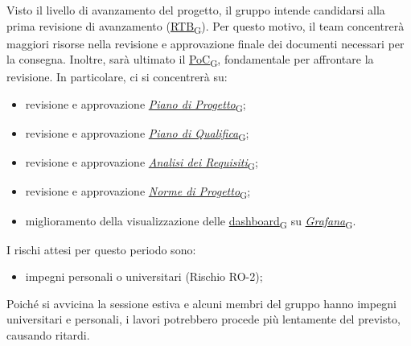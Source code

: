 Visto il livello di avanzamento del progetto, il gruppo intende candidarsi alla prima revisione di avanzamento (\href{https://7last.github.io/docs/rtb/documentazione-interna/glossario\#requirements-and-technology-baseline}{RTB\textsubscript{G}}). Per questo motivo, il team concentrerà maggiori risorse nella revisione e approvazione finale dei documenti necessari per la consegna. Inoltre, sarà ultimato il \href{https://7last.github.io/docs/rtb/documentazione-interna/glossario\#proof-of-concept}{PoC\textsubscript{G}}, fondamentale per affrontare la revisione. In particolare, ci si concentrerà su:
\begin{itemize}
	\item revisione e approvazione \href{https://7last.github.io/docs/rtb/documentazione-interna/glossario\#piano-di-progetto}{\textit{Piano di Progetto}\textsubscript{G}};
	\item revisione e approvazione \href{https://7last.github.io/docs/rtb/documentazione-interna/glossario\#piano-di-qualifica}{\textit{Piano di Qualifica}\textsubscript{G}};
	\item revisione e approvazione \href{https://7last.github.io/docs/rtb/documentazione-interna/glossario\#analisi-dei-requisiti}{\textit{Analisi dei Requisiti}\textsubscript{G}};
	\item revisione e approvazione \href{https://7last.github.io/docs/rtb/documentazione-interna/glossario\#norme-di-progetto}{\textit{Norme di Progetto}\textsubscript{G}};
	\item miglioramento della visualizzazione delle \href{https://7last.github.io/docs/rtb/documentazione-interna/glossario\#dashboard}{dashboard\textsubscript{G}} su \href{https://7last.github.io/docs/rtb/documentazione-interna/glossario\#grafana}{\textit{Grafana}\textsubscript{G}}.
\end{itemize}

\newpage

I rischi attesi per questo periodo sono:
\begin{itemize}
    \item impegni personali o universitari (Rischio RO-2);
\end{itemize}
Poiché si avvicina la sessione estiva e alcuni membri del gruppo hanno impegni universitari e personali, i lavori potrebbero procede più lentamente del previsto, causando ritardi.

